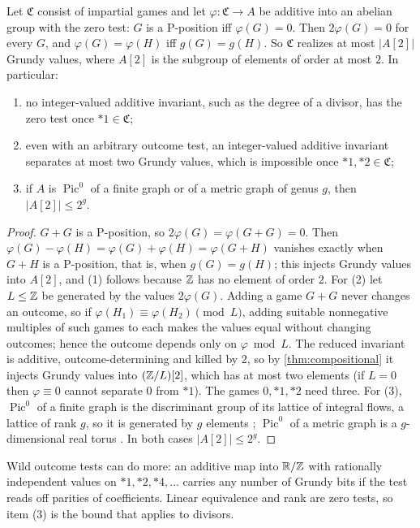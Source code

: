 \begin{theorem}\label{thm:torsion}
Let $\mathfrak C$ consist of impartial games and let $\varphi\colon\mathfrak C\to A$ be additive into an abelian group with the zero test: $G$ is a P-position iff $\varphi(G)=0$. Then $2\varphi(G)=0$ for every $G$, and $\varphi(G)=\varphi(H)$ iff $g(G)=g(H)$. So $\mathfrak C$ realizes at most $|A[2]|$ Grundy values, where $A[2]$ is the subgroup of elements of order at most $2$. In particular:
\begin{enumerate}[label=\textup{(\arabic*)}]
\item no integer-valued additive invariant, such as the degree of a divisor, has the zero test once $*1\in\mathfrak C$;
\item even with an arbitrary outcome test, an integer-valued additive invariant separates at most two Grundy values, which is impossible once $*1,*2\in\mathfrak C$;
\item if $A$ is $\operatorname{Pic}^0$ of a finite graph or of a metric graph of genus $g$, then $|A[2]|\le 2^g$.
\end{enumerate}
\end{theorem}
\begin{proof}
$G+G$ is a P-position, so $2\varphi(G)=\varphi(G+G)=0$. Then $\varphi(G)-\varphi(H)=\varphi(G)+\varphi(H)=\varphi(G+H)$ vanishes exactly when $G+H$ is a P-position, that is, when $g(G)=g(H)$; this injects Grundy values into $A[2]$, and (1) follows because $\mathbb{Z}$ has no element of order $2$.
For (2) let $L\le\mathbb{Z}$ be generated by the values $2\varphi(G)$. Adding a game $G+G$ never changes an outcome, so if $\varphi(H_1)\equiv\varphi(H_2)\pmod L$, adding suitable nonnegative multiples of such games to each makes the values equal without changing outcomes; hence the outcome depends only on $\varphi\bmod L$. The reduced invariant is additive, outcome-determining and killed by $2$, so by \cref{thm:compositional} it injects Grundy values into $(\mathbb{Z}/L)[2]$, which has at most two elements (if $L=0$ then $\varphi\equiv0$ cannot separate $0$ from $*1$). The games $0,*1,*2$ need three.
For (3), $\operatorname{Pic}^0$ of a finite graph is the discriminant group of its lattice of integral flows, a lattice of rank $g$, so it is generated by $g$ elements \cite{BHN}; $\operatorname{Pic}^0$ of a metric graph is a $g$-dimensional real torus \cite{MikhalkinZharkov}. In both cases $|A[2]|\le 2^g$.
\end{proof}

Wild outcome tests can do more: an additive map into $\mathbb{R}/\mathbb{Z}$ with rationally independent values on $*1,*2,*4,\dots$ carries any number of Grundy bits if the test reads off parities of coefficients. Linear equivalence and rank are zero tests, so item (3) is the bound that applies to divisors.

